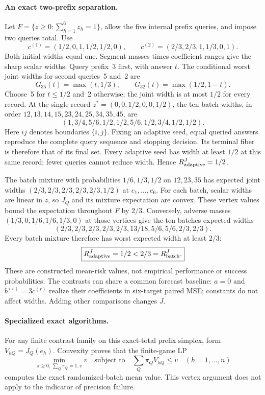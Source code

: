 \paragraph{An exact two-prefix separation.}
Let $F=\{z\geq0:\sum_{h=1}^6z_h=1\}$, allow the five internal prefix
queries, and impose two queries total. Use
\[
 c^{(1)}=(1/2,0,1,1/2,1/2,0),\qquad
 c^{(2)}=(2/3,2/3,1,1/3,0,1).
\]
Both initial widths equal one. Segment masses times coefficient ranges give
the sharp scalar widths. Query prefix~3 first, with answer $t$. The
conditional worst joint widths for second queries~5 and~2 are
\[
 G_{35}(t)=\max(t,1/3),\qquad
 G_{32}(t)=\max(1/2,1-t).
\]
Choose~5 for $t\leq1/2$ and~2 otherwise; the joint width is at most $1/2$
for every record. At the single record $z^*=(0,0,1/2,0,0,1/2)$, the ten
batch widths, in order $12,13,14,15,23,24,25,34,35,45$, are
\[
 (1,3/4,5/6,1/2,1/2,5/6,1/2,3/4,1/2,1/2).
\]
Here $ij$ denotes boundaries $\{i,j\}$. Fixing an adaptive seed, equal
queried answers reproduce the complete query sequence and stopping decision.
Its terminal fiber is therefore that of its final set. Every adaptive seed
has width at least $1/2$ at this same record; fewer queries cannot reduce
width. Hence $R_{\rm adaptive}^{J}=1/2$.

The batch mixture with probabilities $1/6,1/3,1/2$ on $12,23,35$ has expected
joint widths $(2/3,2/3,2/3,2/3,2/3,1/2)$ at $e_1,\ldots,e_6$.
For each batch, scalar widths are linear in $z$, so $J_Q$ and its mixture
expectation are convex. These vertex values bound the expectation throughout
$F$ by $2/3$. Conversely, adverse masses $(1/3,0,1/6,1/6,1/3,0)$ at those
vertices give the ten batches expected widths
\[
 (2/3,2/3,2/3,2/3,2/3,13/18,5/6,5/6,2/3,2/3).
\]
Every batch mixture therefore has worst expected width at least $2/3$:
\[
 \boxed{R_{\rm adaptive}^{J}=1/2<2/3=R_{\rm batch}^{J}.}
\]
These are constructed mean-risk values, not empirical performance or
success probabilities. The contrasts can share a common forecast baseline:
$a=0$ and $b^{(r)}=3c^{(r)}$ realize their coefficients in six-target paired
MSE; constants do not affect widths. Adding other comparisons changes $J$.

\paragraph{Specialized exact algorithms.}
For any finite contrast family on this exact-total prefix simplex, form
$V_{hQ}=J_Q(e_h)$. Convexity proves that the finite-game LP
\[
 \min_{\pi\geq0,\,\sum_Q\pi_Q=1,v}v
 \quad\text{subject to}\quad\sum_Q\pi_QV_{hQ}\leq v\quad(h=1,\ldots,n)
\]
computes the exact randomized-batch mean value. This vertex argument does
not apply to the indicator of precision failure.

